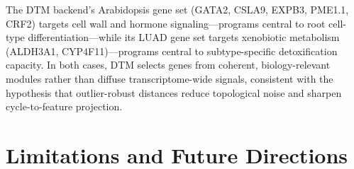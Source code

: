 \documentclass[11pt]{article}
\begin{document}
The DTM backend's Arabidopsis gene set (GATA2, CSLA9, EXPB3, PME1.1, CRF2) targets cell wall and hormone signaling---programs central to root cell-type differentiation---while its LUAD gene set targets xenobiotic metabolism (ALDH3A1, CYP4F11)---programs central to subtype-specific detoxification capacity.
In both cases, DTM selects genes from coherent, biology-relevant modules rather than diffuse transcriptome-wide signals, consistent with the hypothesis that outlier-robust distances reduce topological noise and sharpen cycle-to-feature projection.

\section{Limitations and Future Directions}
\label{sec:limitations}
\end{document}
